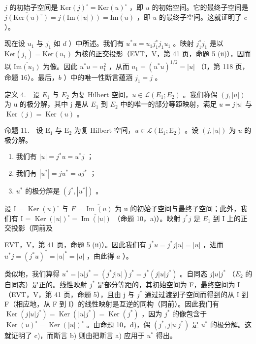 \(j\) 的初始子空间是 \(\mathrm{Ker}(j)^{\circ} = \mathrm{Ker}(u)^{\circ}\) ，即 \(u\) 的初始空间。它的最终子空间是 \(\overline{j(\mathrm{Ker}(u)^{\circ})} = \overline{j(\mathrm{Im}(|u|))} = \overline{\mathrm{Im}(u)}\) ，即 \(u\) 的最终子空间。这就证明了 \(c\) ）。

现在设 \(u_1\) 与 \(j_1\) 如 \(d\) ）中所述。我们有 \(u^*u = u_1j_1^*j_1u_1\) 。映射 \(j_1^*j_1\) 是以 \(\text{Ker}(j_1) = \text{Ker}(u_1)\) 为核的正交投影（EVT，V，第 41 页，命题 5 (ii)），因而以 \(\overline{\text{Im}(u_1)}\) 为像。因此 \(u^*u = u_1^2\) ，从而 \(u_1 = (u^*u)^{1/2} = |u|\) （I，第 118 页，命题 16）。最后，\(b\) ）中的唯一性断言蕴涵 \(j_1 = j\) 。

定义 4.　设 \(E_{1}\) 与 \(E_{2}\) 为复 Hilbert 空间，\(u \in \mathcal{L}(E_{1}; E_{2})\) 。我们称偶 \((j, |u|)\) 为 u 的极分解，其中 j 是从 \(E_{1}\) 到 \(E_{2}\) 中的唯一的部分等距映射，满足 \(u = j|u|\) 与 \(\operatorname{Ker}(j) = \operatorname{Ker}(u)\) 。

命题 11.　设 \(\mathrm{E}_1\) 与 \(\mathrm{E}_2\) 为复 Hilbert 空间，\(u \in \mathcal{L}(\mathrm{E}_1; \mathrm{E}_2)\) 。设 \((j, |u|)\) 为 \(u\) 的极分解。

\begin{enumerate}
\def\labelenumi{\alph{enumi})}
\item
  我们有 \(|u| = j^{*}u = u^{*}j\) ；
\item
  我们有 \(|u^{*}| = j u^{*} = u j^{*}\) ；
\item
  \(u^{*}\) 的极分解是 \((j^{*}, |u^{*}|)\) 。
\end{enumerate}

设 I = \(\operatorname{Ker}(u)^{\circ}\) 与 \(F = \overline{\operatorname{Im}(u)}\) 为 u 的初始子空间与最终子空间；此外，我们有 I = \(\operatorname{Ker}(|u|)^{\circ} = \overline{\operatorname{Im}(|u|)}\) （命题 10，a)）。映射 \(j^{*}j\) 是 \(E_{1}\) 到 I 上的正交投影（同前及

EVT，V，第 41 页，命题 5 (ii)）。因此我们有 \(j^{*}u = j^{*}j|u| = |u|\) ，进而 \(u^{*}j = (j^{*}u)^{*} = |u|^{*} = |u|\) ，由此得 \(a\) ）。

类似地，我们算得 \(u^{*} = |u|j^{*} = (j^{*}j|u|)j^{*} = j^{*}(j|u|j^{*})\) 。自同态 \(j|u|j^{*}\) （\(E_{2}\) 的自同态）是正的。线性映射 \(j^{*}\) 是部分等距的，其初始空间为 F，最终空间为 I（EVT，V，第 41 页，命题 5），且由 j 与 \(j^{*}\) 通过过渡到子空间而得到的从 I 到 F（相应地，从 F 到 I）的线性映射是互逆的同构（同前）。因此我们有 \(\operatorname{Ker}(j|u|j^{*}) = \operatorname{Ker}(|u|j^{*}) = \operatorname{Ker}(j^{*})\) ，因为 \(j^{*}\) 的像包含于 \(\operatorname{Ker}(u)^{\circ} = \operatorname{Ker}(|u|)^{\circ}\) 。由命题 10，d)，偶 \((j^{*}, j|u|j^{*})\) 是 \(u^{*}\) 的极分解。这就证明了 c)，而断言 b) 则由把断言 a) 应用于 \(u^{*}\) 得出。

